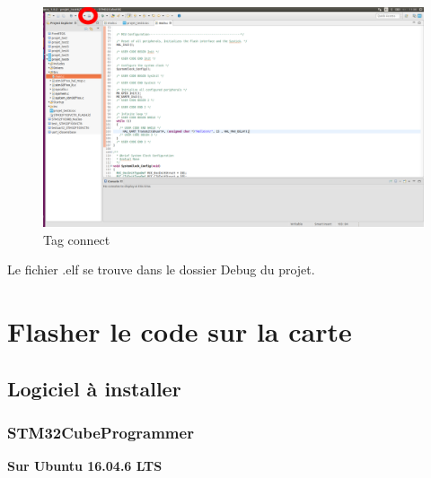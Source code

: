 \documentclass{article}
\begin{document}
\begin{figure}[H]
\begin{center}
\advance\leftskip-3cm
\advance\rightskip-3cm
\includegraphics[keepaspectratio=true,scale=0.3]{build_all.png}
\caption{Tag connect}
\label{visina8}
\end{center}\end{figure}

Le fichier .elf se trouve dans le dossier Debug du projet.

\section{Flasher le code sur la carte}
\subsection{Logiciel à installer}
\subsubsection{STM32CubeProgrammer}
\textbf{Sur Ubuntu 16.04.6 LTS}
\end{document}
